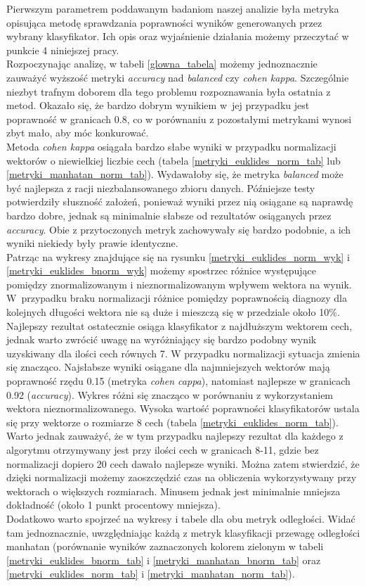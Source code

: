 \documentclass[12pt]{article}
\begin{document}
\indent Pierwszym parametrem poddawanym badaniom naszej analizie była metryka opisująca metodę sprawdzania poprawności wyników generowanych przez wybrany klasyfikator. Ich opis oraz wyjaśnienie działania możemy przeczytać w punkcie 4 niniejszej pracy. \\
\indent Rozpoczynając analizę, w tabeli \ref{glowna_tabela} możemy jednoznacznie zauważyć wyższość metryki \textit{accuracy} nad \textit{balanced} czy \textit{cohen kappa}. Szczególnie niezbyt trafnym doborem dla tego problemu rozpoznawania była ostatnia z metod. Okazało się, że bardzo dobrym wynikiem w~jej przypadku jest poprawność w granicach 0.8, co w porównaniu z pozostałymi metrykami wynosi zbyt mało, aby móc konkurować. \\
\indent Metoda \textit{cohen kappa} osiągała bardzo słabe wyniki w przypadku normalizacji wektorów o niewielkiej liczbie cech (tabela \ref{metryki_euklides_norm_tab} lub \ref{metryki_manhatan_norm_tab}). Wydawałoby się, że metryka \textit{balanced} może być najlepsza z racji niezbalansowanego zbioru danych. Późniejsze testy potwierdziły słuszność założeń, ponieważ wyniki przez nią osiągane są naprawdę bardzo dobre, jednak są minimalnie słabsze od rezultatów osiąganych przez \textit{accuracy}. Obie z przytoczonych metryk zachowywały się bardzo podobnie, a ich wyniki niekiedy były prawie identyczne.\\
\indent Patrząc na wykresy znajdujące się na rysunku \ref{metryki_euklides_norm_wyk} i \ref{metryki_euklides_bnorm_wyk} możemy spostrzec różnice występujące pomiędzy znormalizowanym i nieznormalizowanym wpływem wektora na wynik. W~przypadku braku normalizacji różnice pomiędzy poprawnością diagnozy dla kolejnych długości wektora nie są duże i mieszczą się w przedziale około 10\%. Najlepszy rezultat ostatecznie osiąga klasyfikator z najdłuższym wektorem cech, jednak warto zwrócić uwagę na wyróżniający się bardzo podobny wynik uzyskiwany dla ilości cech równych 7. W przypadku normalizacji sytuacja zmienia się znacząco. Najsłabsze wyniki osiągane dla najmniejszych wektorów mają poprawność rzędu 0.15 (metryka \textit{cohen cappa}), natomiast najlepsze w granicach 0.92 (\textit{accuracy}). Wykres różni się znacząco w porównaniu z wykorzystaniem wektora nieznormalizowanego. Wysoka wartość poprawności klasyfikatorów ustala się przy wektorze o rozmiarze 8 cech (tabela \ref{metryki_euklides_norm_tab}).  Warto jednak zauważyć, że w tym przypadku najlepszy rezultat dla każdego z algorytmu otrzymywany jest przy ilości cech w granicach 8-11, gdzie bez normalizacji dopiero  20 cech dawało najlepsze wyniki. Można zatem stwierdzić, że dzięki normalizacji możemy zaoszczędzić czas na obliczenia wykorzystywany przy wektorach o większych rozmiarach. Minusem jednak jest minimalnie mniejsza dokładność (około 1 punkt procentowy mniejsza). \\
\indent Dodatkowo warto spojrzeć na wykresy i tabele dla obu metryk odległości. Widać tam jednoznacznie, uwzględniając każdą z metryk klasyfikacji przewagę odległości manhatan (porównanie wyników zaznaczonych kolorem zielonym w tabeli \ref{metryki_euklides_bnorm_tab} i \ref{metryki_manhatan_bnorm_tab} oraz \ref{metryki_euklides_norm_tab} i \ref{metryki_manhatan_norm_tab}).\\
\end{document}
